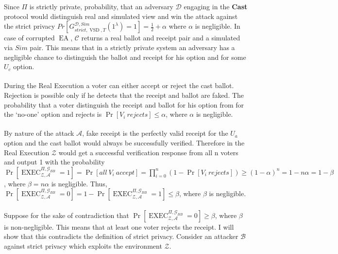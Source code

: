 \documentclass[12pt]{article}
\DeclareMathOperator{\exec}{EXEC}
\DeclareMathOperator{\vsd}{VSD}
\DeclareMathOperator{\ea}{EA}
\def\blockdist{2.3}
\begin{document}
\\\\
 Since $\Pi$ is strictly private, probability, that an adversary $\mathcal{D}$ engaging in the \textbf{Cast} protocol would distinguish real and simulated view and win the attack against the strict privacy $Pr[G_{strict,\vsd,T}^{\mathcal{D},Sim}(1^{\lambda}) = 1] = \frac{1}{2} + \alpha$ where $\alpha$ is negligible. In case of corrupted $\ea$, $\mathcal{C}$ returns a real ballot and receipt pair and a simulated via $Sim$ pair. This means that in a strictly private system an adversary has a negligible chance to distinguish the ballot and receipt for his option and for some $U_c$ option. \\\\
During the Real Execution a voter can either accept or reject the cast ballot. Rejection is possible only if he detects that the receipt and ballot are faked. The probability that a voter distinguish the receipt and ballot for his option from for the `no-one' option and rejects is $\Pr[V_i~rejects] \leq  \alpha$, where $\alpha$ is negligible.\\\\
 By nature of the attack $\mathcal{A}$,  fake receipt is the perfectly valid receipt for the $U_a$ option and the cast ballot would always be successfully verified. Therefore in the Real Execution $\mathcal{Z}$ would get a successful verification response from all n voters and output 1 with the probability $\Pr[\exec_{\mathcal{Z},\mathcal{A}}^{\Pi, \mathcal{G}_{BB}} = 1] =  \Pr[all~V_i~accept] = \prod_{i=0}^n(1- \Pr[V_i~rejects] ) \geq (1 - \alpha)^n = 1 - n\alpha = 1- \beta$, where $\beta = n\alpha $ is negligible. Thus, $\Pr[\exec_{\mathcal{Z},\mathcal{A}}^{\Pi, \mathcal{G}_{BB}} = 0] = 1 - \Pr[\exec_{\mathcal{Z},\mathcal{A}}^{\Pi, \mathcal{G}_{BB}} = 1] \leq \beta$, where $\beta$ is negligible.\\\\
Suppose for the sake of contradiction that $\Pr[\exec_{\mathcal{Z},\mathcal{A}}^{\Pi, \mathcal{G}_{BB}} = 0] \geq  \beta$, where $\beta$ is non-negligible. This means that at least one voter rejects the receipt. I will show that this contradicts the definition of strict privacy. Consider an attacker $\mathcal{B}$ against strict privacy which exploits the environment  $\mathcal{Z}$. \\\\
\end{document}
